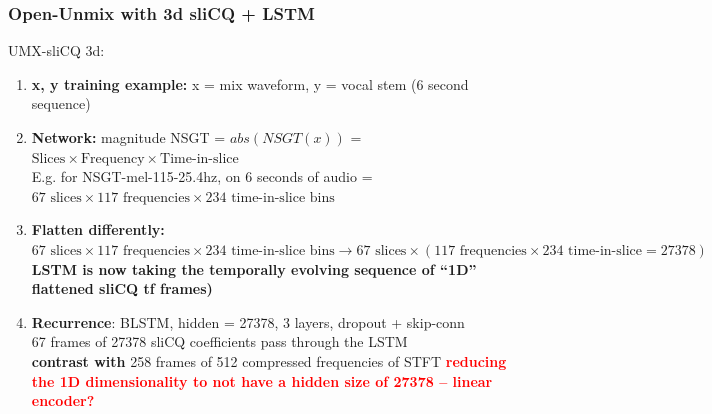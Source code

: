 \documentclass[usenames,dvipsnames]{beamer}
\begin{document}
\begin{frame}
	\frametitle{Open-Unmix with 3d sliCQ + LSTM}
	UMX-sliCQ 3d:
	\begin{enumerate}
		\item
			\textbf{x, y training example:} x = mix waveform, y = vocal stem (6 second sequence)
		\item
			\textbf{Network:} magnitude NSGT = $abs(NSGT(x))$ = $\text{Slices} \times \text{Frequency} \times \text{Time-in-slice}$\\E.g. for NSGT-mel-115-25.4hz, on 6 seconds of audio = $67 \text{ slices} \times 117 \text{ frequencies} \times 234 \text{ time-in-slice bins} $
		\item
			\textbf{Flatten differently:} $67 \text{ slices} \times 117 \text{ frequencies} \times 234 \text{ time-in-slice bins} \rightarrow 67 \text{ slices} \times (117 \text { frequencies} \times 234 \text { time-in-slice} = 27378)$\\
			\textbf{LSTM is now taking the temporally evolving sequence of ``1D'' flattened sliCQ tf frames)}
		\item
			\textbf{Recurrence}: BLSTM, hidden = 27378, 3 layers, dropout + skip-conn\\
			67 frames of 27378 sliCQ coefficients pass through the LSTM\\
			\textbf{contrast with} 258 frames of 512 compressed frequencies of STFT
			\textbf{\textcolor{red}{reducing the 1D dimensionality to not have a hidden size of 27378 -- linear encoder?}}
	\end{enumerate}
\end{frame}
\end{document}
